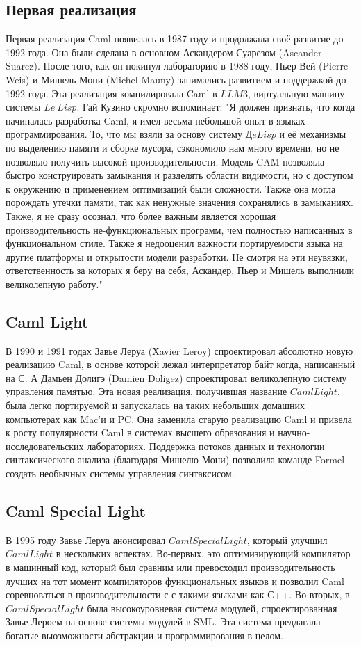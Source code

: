 \documentclass[14pt]{matmex-diploma-custom}
\begin{document}
\subsection{Первая реализация}
Первая реализация Caml появилась в 1987 году и продолжала своё развитие до 1992 года. Она были сделана в основном Аскандером Суарезом (Ascander Suarez). После того, как он покинул лабораторию в 1988 году, Пьер Вей (Pierre Weis) и Мишель Мони (Michel Mauny) занимались развитием и поддержкой до 1992 года. Эта реализация компилировала Caml в  $LLM3$, виртуальную машину системы $Le\ Lisp$. Гай Кузино скромно вспоминает: "Я должен признать, что когда начиналась разработка Caml, я имел весьма небольшой опыт в языках программирования. То, что мы взяли за основу систему $Дe Lisp$ и её механизмы по выделению памяти и сборке мусора, сэкономило нам много времени, но не позволяло получить высокой производительности. Модель CAM позволяла быстро конструировать замыкания и разделять области видимости, но с доступом к окружению и применением оптимизаций были сложности. Также она могла порождать утечки памяти, так как ненужные значения сохранялись в замыканиях. Также, я не сразу осознал, что более важным является хорошая производительность не-функциональных программ, чем полностью  написанных в функциональном стиле. Также я недооценил важности портируемости языка на другие платформы и открытости модели разработки. Не смотря на эти неувязки, ответственность за которых я беру на себя, Аскандер, Пьер и Мишель выполнили великолепную работу."


\subsection{Caml Light}
В 1990 и 1991 годах Завье Леруа (Xavier Leroy) спроектировал абсолютно новую реализацию Caml, в основе которой лежал интерпретатор байт когда, написанный на С. А Дамьен Долигэ (Damien Doligez) спроектировал великолепную систему управления памятью. Эта новая реализация, получившая название $Caml Light$, была легко портируемой и запускалась на таких небольших домашних компьютерах как Mac'и и PC. Она заменила старую реализацию Caml и привела к росту популярности Caml в системах высшего образования и научно-исследовательских лабораториях. Поддержка потоков данных и технологии синтаксического анализа (благодаря Мишелю Мони) позволила команде Formel создать необычных системы управления синтаксисом. 

\subsection{Caml Special Light}
В 1995 году Завье Леруа анонсировал $Caml Special Light$, который улучшил $Caml Light$ в нескольких аспектах. Во-первых, это оптимизирующий компилятор в машинный код, который был сравним или превосходил производительность лучших на тот момент компиляторов функциональных языков и позволил Caml соревноваться в производительности с с такими языками как С++. Во-вторых, в $Caml Special Light$ была высокоуровневая система модулей, спроектированная Завье Лероем на основе системы модулей в SML. Эта система предлагала богатые выозможности абстракции и программирования в целом. 
\end{document}
